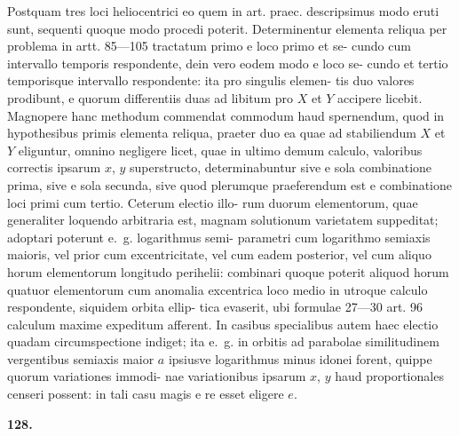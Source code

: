 \documentclass[12pt,a4paper]{article}
\begin{document}
Postquam tres loci heliocentrici eo quem in art. praec. descripsimus modo
eruti sunt, sequenti quoque modo procedi poterit. Determinentur elementa
reliqua per problema in artt. 85---105 tractatum primo e loco primo et se-
cundo cum intervallo temporis respondente, dein vero eodem modo e loco se-
cundo et tertio temporisque intervallo respondente: ita pro singulis elemen-
tis duo valores prodibunt, e quorum differentiis duas ad libitum pro $X$ et $Y$
accipere licebit. Magnopere hanc methodum commendat commodum haud
spernendum, quod in hypothesibus primis elementa reliqua, praeter duo ea
quae ad stabiliendum $X$ et $Y$ eliguntur, omnino negligere licet, quae in ultimo
demum calculo, valoribus correctis ipsarum $x$, $y$ superstructo, determinabuntur
sive e sola combinatione prima, sive e sola secunda, sive quod plerumque
praeferendum est e combinatione loci primi cum tertio. Ceterum electio illo-
rum duorum elementorum, quae generaliter loquendo arbitraria est, magnam
solutionum varietatem suppeditat; adoptari poterunt e.~g. logarithmus semi-
parametri cum logarithmo semiaxis maioris, vel prior cum excentricitate, vel
cum eadem posterior, vel cum aliquo horum elementorum longitudo perihelii:
combinari quoque poterit aliquod horum quatuor elementorum cum anomalia
excentrica loco medio in utroque calculo respondente, siquidem orbita ellip-
tica evaserit, ubi formulae 27---30 art. 96 calculum maxime expeditum afferent.
In casibus specialibus autem haec electio quadam circumspectione indiget;
ita e.~g. in orbitis ad parabolae similitudinem vergentibus semiaxis maior $a$
ipsiusve logarithmus minus idonei forent, quippe quorum variationes immodi-
nae variationibus ipsarum $x$, $y$ haud proportionales censeri possent: in tali
casu magis e re esset eligere $e$.

\bigskip
\noindent\textbf{128.}
\end{document}
